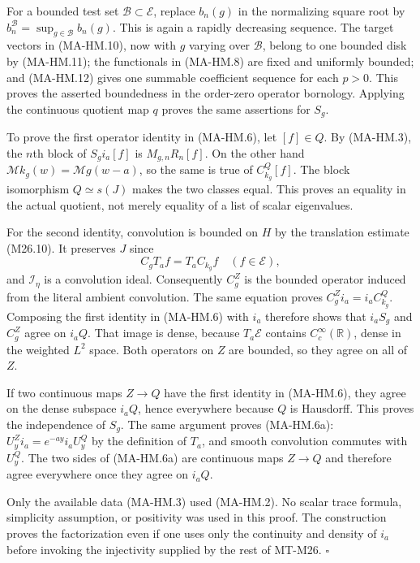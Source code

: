 For a bounded test set $\mathcal B\subset\mathcal E$, replace
$b_n(g)$ in the normalizing square root by
$b_n^{\mathcal B}=\sup_{g\in\mathcal B}b_n(g)$.
This is again a rapidly decreasing sequence.  The target
vectors in (MA-HM.10), now with $g$ varying over $\mathcal B$,
belong to one bounded disk by (MA-HM.11); the functionals
in (MA-HM.8) are fixed and uniformly bounded; and
(MA-HM.12) gives one summable coefficient sequence for each
$p>0$.  This proves the asserted boundedness in the
order-zero operator bornology.  Applying the continuous
quotient map $q$ proves the same assertions for $S_g$.

To prove the first operator identity in (MA-HM.6), let $[f]\in Q$.
By (MA-HM.3), the $n$th block of $S_gi_a[f]$ is
$M_{g,n}R_n[f]$.  On the other hand
$\mathcal M k_g(w)=\mathcal Mg(w-a)$, so the same is true
of $C_{k_g}^Q[f]$.  The block isomorphism $Q\simeq s(J)$
makes the two classes equal.  This proves an equality in
the actual quotient, not merely equality of a list of scalar
eigenvalues.

For the second identity, convolution is bounded on $H$ by
the translation estimate (M26.10).  It preserves $J$ since
\[
       C_gT_af=T_aC_{k_g}f
       \quad(f\in\mathcal E),
 \tag{MA-HM.13}
\]
and $\mathcal I_\eta$ is a convolution ideal.  Consequently
$C_g^Z$ is the bounded operator induced from the literal
ambient convolution.  The same equation proves
$C_g^Zi_a=i_aC_{k_g}^Q$.  Composing the first identity in
(MA-HM.6) with $i_a$ therefore shows that $i_aS_g$ and
$C_g^Z$ agree on $i_aQ$.  That image is dense, because
$T_a\mathcal E$ contains $C_c^\infty(\mathbb R)$, dense in
the weighted $L^2$ space.  Both operators on $Z$ are
bounded, so they agree on all of $Z$.

If two continuous maps $Z\to Q$ have the first identity in
(MA-HM.6), they agree on the dense subspace $i_aQ$, hence
everywhere because $Q$ is Hausdorff.  This proves the
independence of $S_g$.  The same argument proves (MA-HM.6a):
$U_y^Zi_a=e^{-ay}i_aU_y^Q$ by the definition of $T_a$,
and smooth convolution commutes with $U_y^Q$.  The two
sides of (MA-HM.6a) are continuous maps $Z\to Q$ and
therefore agree everywhere once they agree on $i_aQ$.

Only the available data (MA-HM.3) used (MA-HM.2).
No scalar trace formula, simplicity assumption, or positivity
was used in this proof.  The construction proves the
factorization even if one uses only the continuity and
density of $i_a$ before invoking the injectivity supplied
by the rest of MT-M26. \hfill$\square$

